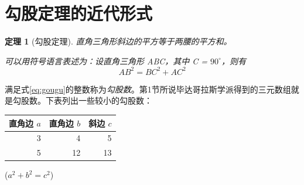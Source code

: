 \documentclass[UTF8]{ctexart}
\newtheorem{thm}{定理}
\newcommand\degree{^\circ}
\begin{document}
\section{勾股定理的近代形式}
\begin{thm}[勾股定理]
直角三角形斜边的平方等于两腰的平方和。

可以用符号语言表述为：设直角三角形 ABC，其中 \angle C = $90\degree$，则有
\begin{equation}\label{eq:gougu}
AB^2=BC^2+AC^2
\end{equation}
\end{thm}
满足式\eqref{eq:gougu}的整数称为\emph{勾股数}。第1节所说毕达哥拉斯学派得到的三元数组就是勾股数。下表列出一些较小的勾股数：
\begin{table}[H]
\begin{tabular}{|rrr|}
\hline
直角边 $a$ & 直角边 $b$ & 斜边 $c$\\
\hline
3 & 4 & 5 \\
5 & 12 & 13 \\
\hline
\end{tabular}
\qquad
($a^2 + b^2 = c^2$)
\end{table}


\nocite{Shiye}

\end{document}
